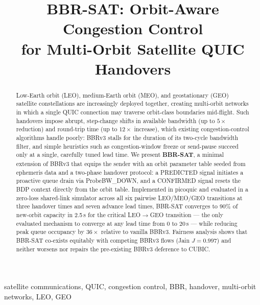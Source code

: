 \documentclass[conference]{IEEEtran}
\begin{document}
\title{BBR-SAT: Orbit-Aware Congestion Control\\
       for Multi-Orbit Satellite QUIC Handovers}

\author{
}

\maketitle

\begin{abstract}
Low-Earth orbit (LEO), medium-Earth orbit (MEO), and geostationary (GEO)
satellite constellations are increasingly deployed together, creating
multi-orbit networks in which a single QUIC connection may traverse
orbit-class boundaries mid-flight.
Such handovers impose abrupt, step-change shifts in available bandwidth
(up to $5\times$ reduction) and round-trip time (up to $12\times$ increase),
which existing congestion-control algorithms handle poorly:
BBRv3 stalls for the duration of its two-cycle bandwidth filter, and
simple heuristics such as congestion-window freeze or send-pause succeed
only at a single, carefully tuned lead time.
We present \textbf{BBR-SAT}, a minimal extension of BBRv3 that equips the
sender with an orbit parameter table seeded from ephemeris data and a
two-phase handover protocol: a PREDICTED signal initiates a proactive queue
drain via ProbeBW\_DOWN, and a CONFIRMED signal resets the BDP context
directly from the orbit table.
Implemented in picoquic and evaluated in a zero-loss shared-link simulator
across all six pairwise LEO/MEO/GEO transitions at three handover times and
seven advance lead times, BBR-SAT converges to 90\% of new-orbit capacity
in 2.5\,s for the critical LEO$\to$GEO transition --- the only evaluated
mechanism to converge at any lead time from 0 to 20\,s ---
while reducing peak queue occupancy by $36\times$ relative to vanilla BBRv3.
Fairness analysis shows that BBR-SAT co-exists equitably with competing
BBRv3 flows (Jain $J = 0.997$) and neither worsens nor repairs the
pre-existing BBRv3 deference to CUBIC.
\end{abstract}

\begin{IEEEkeywords}
satellite communications, QUIC, congestion control, BBR, handover,
multi-orbit networks, LEO, GEO
\end{IEEEkeywords}
\end{document}
